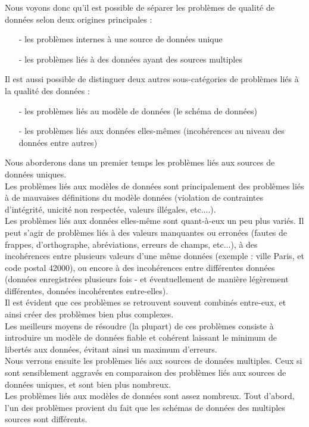 Nous voyons donc qu’il est possible de séparer les problèmes de qualité de données selon deux origines principales :
\begin{itemize}
\item[-]les problèmes internes à une source de données unique
\item[-]les problèmes liés à des données ayant des sources multiples
\end{itemize}
Il est aussi possible de distinguer deux autres sous-catégories de problèmes liés à la qualité des données :
\begin{itemize}
\item[-]les problèmes liés au modèle de données (le schéma de données)
\item[-]les problèmes liés aux données elles-mêmes (incohérences au niveau des données entre autres)
\end{itemize}
Nous aborderons dans un premier temps les problèmes liés aux sources de données uniques.\\
Les problèmes liés aux modèles de données sont principalement des problèmes liés à de mauvaises définitions du modèle données (violation de contraintes d’intégrité, unicité non respectée, valeurs illégales, etc....).\\
Les problèmes liés aux données elles-même sont quant-à-eux un peu plus variés. Il peut s’agir de problèmes liés à des valeurs manquantes ou erronées (fautes de frappes, d’orthographe, abréviations, erreurs de champs, etc...), à des incohérences entre plusieurs valeurs d’une même données (exemple : ville Paris, et code postal 42000), ou encore à des incohérences entre différentes données (données enregistrées plusieurs fois - et éventuellement de manière légèrement différentes, données incohérentes entre-elles).\\
Il est évident que ces problèmes se retrouvent souvent combinés entre-eux, et ainsi créer des problèmes bien plus complexes.\\
Les meilleurs moyens de résoudre (la plupart) de ces problèmes consiste à introduire un modèle de données fiable et cohérent laissant le minimum de libertés aux données, évitant ainsi un maximum d’erreurs.\\
Nous verrons ensuite les problèmes liés aux sources de données multiples. Ceux si sont sensiblement aggravés en comparaison des problèmes liés aux sources de données uniques, et sont bien plus nombreux.\\
Les problèmes liés aux modèles de données sont assez nombreux. Tout d’abord, l’un des problèmes provient du fait que les schémas de données des multiples sources sont différents.\\
